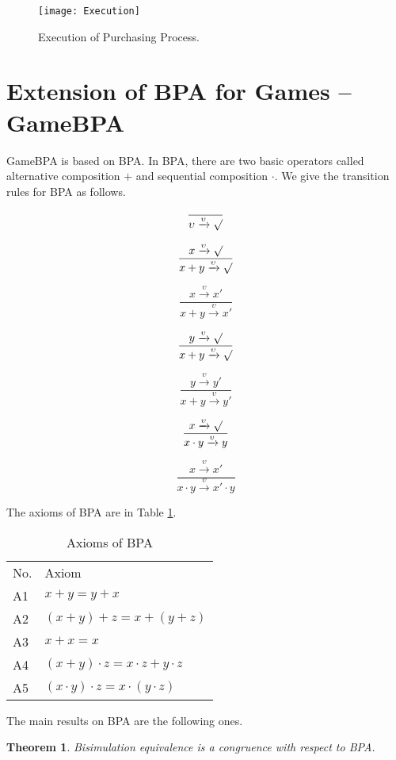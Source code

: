\documentclass{fac}
\newtheorem{theorem}{Theorem}[section]
\begin{document}
\begin{figure}
  \centering
\texttt{[image: Execution]}
  \caption{Execution of Purchasing Process.}
  \label{Execution}
\end{figure}

\section{Extension of BPA for Games -- GameBPA}\label{extension}
GameBPA is based on BPA. In BPA, there are two basic operators called alternative composition $+$ and sequential composition $\cdot$. We give the transition rules for BPA as follows.

$$
\frac{}{\upsilon\xrightarrow{\upsilon}\surd}
$$

$$
\frac{x\xrightarrow{\upsilon}\surd}{x + y\xrightarrow{\upsilon}\surd}
$$

$$
\frac{x\xrightarrow{\upsilon}x'}{x + y\xrightarrow{\upsilon}x'}
$$

$$
\frac{y\xrightarrow{\upsilon}\surd}{x + y\xrightarrow{\upsilon}\surd}
$$

$$
\frac{y\xrightarrow{\upsilon}y'}{x + y\xrightarrow{\upsilon}y'}
$$

$$
\frac{x\xrightarrow{\upsilon}\surd}{x \cdot y\xrightarrow{\upsilon}y}
$$

$$
\frac{x\xrightarrow{\upsilon}x'}{x \cdot y\xrightarrow{\upsilon}x'\cdot y}
$$

The axioms of BPA are in Table \ref{AxiomOfBPA}.

\begin{center}
\begin{table}
  \begin{tabular}{@{}ll@{}}
\hline No. &Axiom\\
  A1 & $x + y = y + x$ \\
  A2 & $(x + y) + z = x + (y + z)$ \\
  A3 & $x + x = x$ \\
  A4 & $(x + y)\cdot z = x\cdot z + y\cdot z$ \\
  A5 & $(x\cdot y)\cdot z = x\cdot (y\cdot z)$\\
\end{tabular}
\caption{Axioms of BPA}
\label{AxiomOfBPA}
\end{table}
\end{center}

The main results on BPA are the following ones.

\begin{theorem}
Bisimulation equivalence is a congruence with respect to BPA.
\end{theorem}
\end{document}
